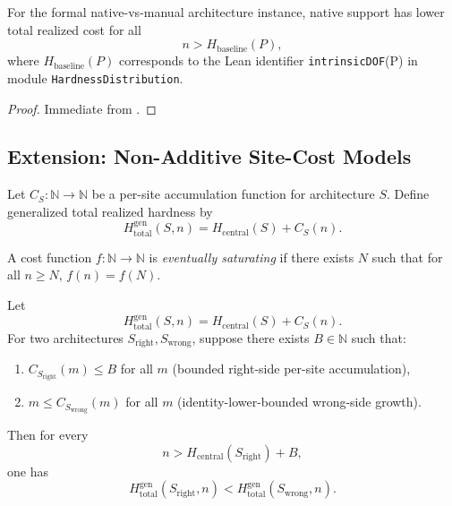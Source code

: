 \begin{corollary}\label{cor:type-system-threshold}
For the formal native-vs-manual architecture instance, native support has lower total realized cost for all
\[
n > H_{\mathrm{baseline}}(P),
\]
where $H_{\mathrm{baseline}}(P)$ corresponds to the Lean identifier
\texttt{intrinsicDOF}(P) in module \nolinkurl{HardnessDistribution}.
\end{corollary}

\begin{proof}
Immediate from .
\end{proof}

\subsection{Extension: Non-Additive Site-Cost Models}\label{sec:nonadditive-site-costs}

\begin{definition}\label{def:generalized-site-accumulation}
Let $C_S : \mathbb{N} \to \mathbb{N}$ be a per-site accumulation function for architecture $S$. Define generalized total realized hardness by
\[
H_{\text{total}}^{\mathrm{gen}}(S,n) = H_{\text{central}}(S) + C_S(n).
\]
\end{definition}

\begin{definition}\label{def:eventual-saturation}
A cost function $f : \mathbb{N}\to\mathbb{N}$ is \emph{eventually saturating} if there exists $N$ such that for all $n\ge N$, $f(n)=f(N)$.
\end{definition}

\begin{theorem}\label{thm:generalized-dominance}
Let
\[
H_{\text{total}}^{\mathrm{gen}}(S,n)=H_{\text{central}}(S)+C_S(n).
\]
For two architectures $S_{\mathrm{right}},S_{\mathrm{wrong}}$, suppose there exists $B\in\mathbb{N}$ such that:
\begin{enumerate}
\item $C_{S_{\mathrm{right}}}(m)\le B$ for all $m$ (bounded right-side per-site accumulation),
\item $m \le C_{S_{\mathrm{wrong}}}(m)$ for all $m$ (identity-lower-bounded wrong-side growth).
\end{enumerate}
Then for every
\[
n > H_{\text{central}}(S_{\mathrm{right}})+B,
\]
one has
\[
H_{\text{total}}^{\mathrm{gen}}(S_{\mathrm{right}},n)
<
H_{\text{total}}^{\mathrm{gen}}(S_{\mathrm{wrong}},n).
\]
\end{theorem}

